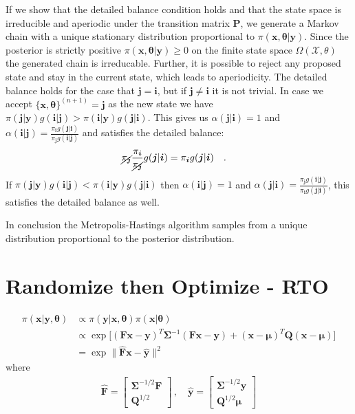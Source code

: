 If we show that the detailed balance condition holds and that the state space is irreducible and aperiodic under the transition matrix $\bm{P}$, we generate a Markov chain with a unique stationary distribution proportional to $\pi (\bm{x} , \bm{\theta} | \bm{y})$.
Since the posterior is strictly positive $\pi (\bm{x} , \bm{\theta} | \bm{y}) \geq 0$ on the finite state space $\Omega(\mathcal{X},\mathcal{\theta})$ the generated chain is irreducable.
Further, it is possible to reject any proposed state and stay in the current state, which leads to aperiodicity.
The detailed balance holds for the case that $\bm{j} = \bm{i}$, but if $\bm{j} \neq \bm{i}$ it is not trivial.
In case we accept $\{ \bm{x}, \bm{\theta} \}^{(n+1)} = \bm{j}$ as the new state we have $ \pi(\bm{j} | \bm{y})  g(\bm{i}|\bm{j})> \pi(\bm{i} | \bm{y})  g(\bm{j}|\bm{i})$.
This gives us $\alpha(\bm{j}|\bm{i}) = 1$ and $\alpha(\bm{i}|\bm{j}) = \frac{\pi_{\bm{i}} g(\bm{j}|\bm{i})}{\pi_{\bm{j}} g(\bm{i}|\bm{j})}$ and satisfies the detailed balance:
\begin{align*}
    \cancel{\pi_{\bm{j}}}  \frac{\pi_{\bm{i}}}{\cancel{\pi_{\bm{j}}}} g(\bm{j}|\bm{i}) &= \pi_{\bm{i}} g(\bm{j}|\bm{i}) \quad .
\end{align*}
If $ \pi(\bm{j} | \bm{y})  g(\bm{i}|\bm{j}) < \pi(\bm{i} | \bm{y})  g(\bm{j}|\bm{i})$ then $\alpha(\bm{i}|\bm{j}) = 1$
and $\alpha(\bm{j}|\bm{i}) = \frac{\pi_{\bm{j}} g(\bm{i}|\bm{j})}{\pi_{\bm{i}} g(\bm{j}|\bm{i})}$, this satisfies the detailed balance as well.

In conclusion the Metropolis-Hastings algorithm samples from a unique distribution proportional to the posterior distribution. 

\chapter{Randomize then Optimize - RTO}
\label{ap:RTO}

\begin{align}
    \pi(\bm{x}|\bm{y}, \bm{\theta} ) &\propto \pi(\bm{y} | \bm{x} , \bm{\theta} ) \pi(\bm{x}| \bm{\theta}) \\
   &\propto \exp \Big[  ( \bm{F x} - \bm{y})^T \bm{\Sigma}^{-1}( \bm{F x} - \bm{y}) + (\bm{x} -\bm{\mu} )^T \bm{Q} (\bm{x} -\bm{\mu})\Big] \\
   &= \exp  \lVert \hat{\bm{F}} \bm{x} - \hat{\bm{y}} \rVert^2 
\end{align}
where 
\begin{align}
\hat{\bm{F}} = 
    \begin{bmatrix}
         \bm{\Sigma}^{-1/2} \bm{F}\\
    \bm{Q}^{1/2}
    \end{bmatrix} \, , \quad \hat{\bm{y}} = 
    \begin{bmatrix}
        \bm{\Sigma}^{-1/2} \bm{y} \\
        \bm{Q}^{1/2}\bm{\mu}
    \end{bmatrix}
\end{align}

